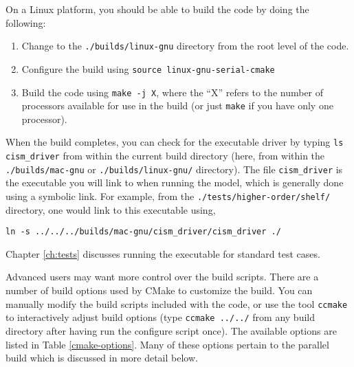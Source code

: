 \begin{mdframed}[style=ubuntu] %
On a Linux platform, you should be able to build the code by doing the following:

\begin{enumerate}
\item{Change to the \texttt{./builds/linux-gnu} directory from the root level of the code.}
\item{Configure the build using \texttt{source linux-gnu-serial-cmake}}
\item{Build the code using \texttt{make -j X}, where the ``X'' refers to the number of processors available for use in the build (or just \texttt{make} if you have only one processor).}
\end{enumerate}
\end{mdframed}                 %

When the build completes, you can check for the executable driver by typing \texttt{ls cism\_driver} from within the current build directory (here, from within the \texttt{./builds/mac-gnu} or \texttt{./builds/linux-gnu/} directory). The file \texttt{cism\_driver} is the executable you will link to when running the model, which is generally done using a symbolic link. For example, from the \texttt{./tests/higher-order/shelf/} directory, one would link to this executable using, 

\begin{verbatim}
ln -s ../../../builds/mac-gnu/cism_driver/cism_driver ./
\end{verbatim}

Chapter \ref{ch:tests} discusses running the executable for standard test cases.

Advanced users may want more control over the build scripts.  There are a number of
build options used by CMake to customize the build.  You can manually modify the 
build scripts included with the code, or use the tool \texttt{ccmake} to 
interactively adjust build options (type \texttt{ccmake ../../} from any build directory
after having run the configure script once).  The available options are listed in Table \ref{cmake-options}.
Many of these options pertain to the parallel build which is discussed in more detail below.


